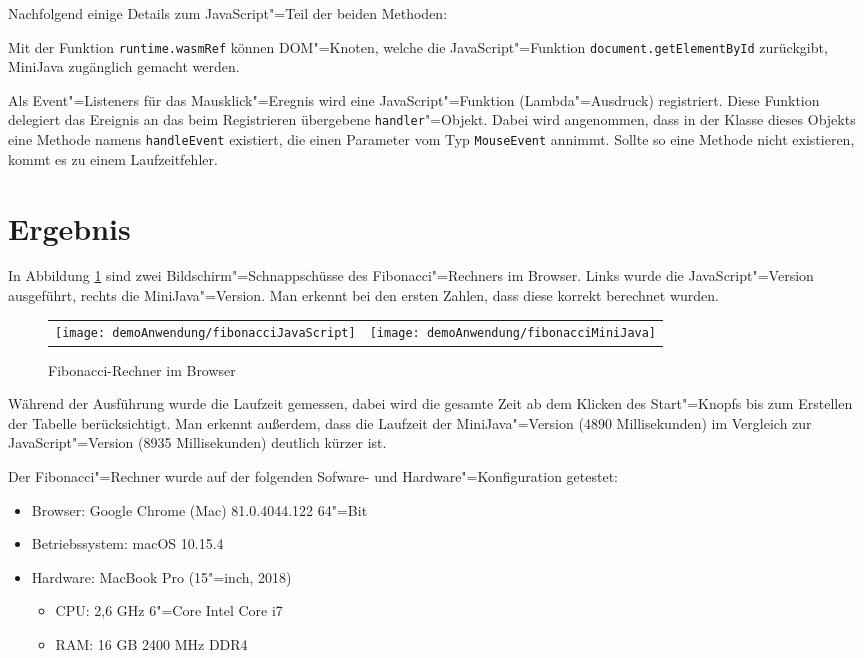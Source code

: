 


Nachfolgend einige Details zum JavaScript"=Teil der beiden Methoden:

Mit der Funktion \lstinline{runtime.wasmRef} können DOM"=Knoten, welche die JavaScript"=Funktion \lstinline{document.getElementById} zurückgibt, MiniJava zugänglich gemacht werden.

Als Event"=Listeners für das Mausklick"=Eregnis wird eine JavaScript"=Funktion (Lambda"=Ausdruck) registriert. Diese Funktion delegiert das Ereignis an das beim Registrieren übergebene \lstinline{handler}"=Objekt. Dabei wird angenommen, dass in der Klasse dieses Objekts eine Methode namens \lstinline{handleEvent} existiert, die einen Parameter vom Typ \lstinline{MouseEvent} annimmt. Sollte so eine Methode nicht existieren, kommt es zu einem Laufzeitfehler.

\section{Ergebnis}

In Abbildung \ref{fig:fibCalculatorBrowser} sind zwei Bildschirm"=Schnappschüsse des Fibonacci"=Rechners im Browser. Links wurde die JavaScript"=Version ausgeführt, rechts die MiniJava"=Version. Man erkennt bei den ersten Zahlen, dass diese korrekt berechnet wurden.

\begin{figure}[]
    \centering
    \begin{tabular}{c c}
        \texttt{[image: demoAnwendung/fibonacciJavaScript]} & \texttt{[image: demoAnwendung/fibonacciMiniJava]}
    \end{tabular}
    \caption{Fibonacci-Rechner im Browser}
    \label{fig:fibCalculatorBrowser}
\end{figure}

Während der Ausführung wurde die Laufzeit gemessen, dabei wird die gesamte Zeit ab dem Klicken des Start"=Knopfs bis zum Erstellen der Tabelle berücksichtigt. Man erkennt außerdem, dass die Laufzeit der MiniJava"=Version (4890 Millisekunden) im Vergleich zur JavaScript"=Version (8935 Millisekunden) deutlich kürzer ist.

Der Fibonacci"=Rechner wurde auf der folgenden Sofware- und Hardware"=Konfiguration getestet:
\begin{itemize}
    \item Browser: Google Chrome (Mac) 81.0.4044.122 64"=Bit
    \item Betriebssystem: macOS 10.15.4
    \item Hardware: MacBook Pro (15"=inch, 2018)
    \begin{itemize}
        \item CPU: 2,6 GHz 6"=Core Intel Core i7
        \item RAM: 16 GB 2400 MHz DDR4
    \end{itemize}
\end{itemize}

